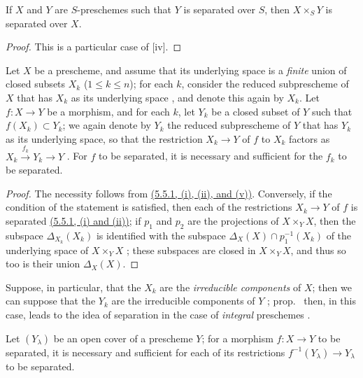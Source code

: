 \begin{cor}[5.5.3]
\label{1.5.5.3}
If $X$ and $Y$ are $S$-preschemes such that $Y$ is separated over $S$, then $X\times_S Y$ is separated over $X$.
\end{cor}

\begin{proof}
\label{proof-1.5.5.3}
This is a particular case of [iv].
\end{proof}

\begin{prop}[5.5.4]
\label{1.5.5.4}
Let $X$ be a prescheme, and assume that its underlying space is a \emph{finite} union of closed subsets $X_k$ ($1\leq k\leq n$);
for each $k$, consider the reduced subprescheme of $X$ that has $X_k$ as its underlying space , and denote this again by $X_k$.
Let $f:X\to Y$ be a morphism, and for each $k$, let $Y_k$ be a closed subset of $Y$ such that $f(X_k)\subset Y_k$;
we again denote by $Y_k$ the reduced subprescheme of $Y$ that has $Y_k$ as its underlying space, so that the restriction $X_k\to Y$ of $f$ to $X_k$ factors as $X_k\xrightarrow{f_k}Y_k\to Y$ .
For $f$ to be separated, it is necessary and sufficient for the $f_k$ to be separated.
\end{prop}

\begin{proof}
\label{proof-1.5.5.4}
The necessity follows from \hyperref[1.5.5.1]{(5.5.1, (i), (ii), and (v))}.
Conversely, if the condition of the statement is satisfied, then each of the restrictions $X_k\to Y$ of $f$ is separated \hyperref[1.5.5.1]{(5.5.1, (i) and (ii))};
if $p_1$ and $p_2$ are the projections of $X\times_Y X$, then the subspace $\Delta_{X_k}(X_k)$ is identified with the subspace $\Delta_X(X)\cap p_1^{-1}(X_k)$ of the underlying space of $X\times_Y X$ ;
these subspaces are closed in $X\times_Y X$, and thus so too is their union $\Delta_X(X)$.
\end{proof}

Suppose, in particular, that the $X_k$ are the \emph{irreducible components} of $X$;
then we can suppose that the $Y_k$ are the irreducible components of $Y$ ;
prop.~ then, in this case, leads to the idea of separation in the case of \emph{integral} preschemes .

\begin{prop}[5.5.5]
\label{1.5.5.5}
Let $(Y_\lambda)$ be an open cover of a prescheme $Y$;
for a morphism $f:X\to Y$ to be separated, it is necessary and sufficient for each of its restrictions $f^{-1}(Y_\lambda)\to Y_\lambda$ to be separated.
\end{prop}

